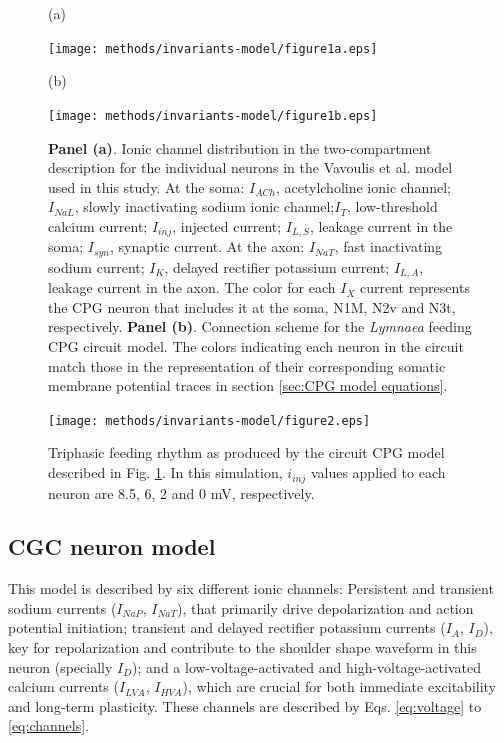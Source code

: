 \begin{figure}[htb!]
	\centering
	\begin{minipage}[t]{0.45\textwidth}
		\raggedright
		(a) \par
		\vspace{65pt}
		\centering
		\texttt{[image: methods/invariants-model/figure1a.eps]}
	\end{minipage}\hfill
	\begin{minipage}[t]{0.35\textwidth}
		\raggedright
		(b) \par
		\centering
		\texttt{[image: methods/invariants-model/figure1b.eps]}
	\end{minipage}
	\caption{\textbf{Panel (a)}. Ionic channel distribution in the two-compartment description for the individual neurons in the Vavoulis et al. model used in this study. At the soma: $I_{ACh}$, acetylcholine ionic channel; $I_{NaL}$, slowly inactivating sodium
		ionic channel;$I_T$, low-threshold calcium current; $I_{inj}$, injected current; $I_{L,S}$, leakage current in the soma; $I_{syn}$, synaptic current. At the axon: $I_{NaT}$, fast inactivating sodium current; $I_K$, delayed rectifier potassium current; $I_{L,A}$, leakage current in the axon. The color for each $I_X$ current represents the CPG neuron that includes it at the soma,  N1M, N2v and N3t, respectively. \textbf{Panel (b)}. Connection scheme for the {\sl Lymnaea} feeding CPG circuit model. The colors indicating each neuron in the circuit match those in the representation of their corresponding somatic membrane potential traces in section \ref{sec:CPG model equations}. 
	}
	\label{fig:CPG diagram 2 compartments}
\end{figure}

\begin{figure}[htb!]
	\centering
	\texttt{[image: methods/invariants-model/figure2.eps]}
	\caption{Triphasic feeding rhythm as produced by the circuit CPG model described in Fig. \ref{fig:CPG diagram 2 compartments}. In this simulation, $i_{inj}$ values applied to each neuron are 8.5, 6, 2 and 0 mV, respectively.}
	\label{fig:model simulation}
\end{figure}



\subsection{CGC neuron model}
\label{subsec:cgc neuron model equations}
This model is described by six different ionic channels: Persistent and transient sodium currents ($I_{NaP}$, $I_{NaT}$), that primarily drive depolarization and action potential initiation; transient and delayed rectifier potassium currents ($I_A$, $I_D$), key for repolarization and contribute to the shoulder shape waveform in this neuron (specially $I_D$); and a low-voltage-activated and high-voltage-activated calcium currents ($I_{LVA}$, $I_{HVA}$), which are crucial for both immediate excitability and long-term plasticity. These channels are described by Eqs. \ref{eq:voltage} to \ref{eq:channels}. 

